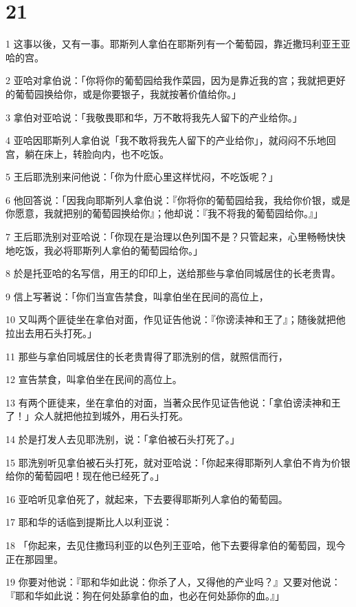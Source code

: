 \chapter{21}

\par 1 这事以後，又有一事。耶斯列人拿伯在耶斯列有一个葡萄园，靠近撒玛利亚王亚哈的宫。
\par 2 亚哈对拿伯说：「你将你的葡萄园给我作菜园，因为是靠近我的宫；我就把更好的葡萄园换给你，或是你要银子，我就按著价值给你。」
\par 3 拿伯对亚哈说：「我敬畏耶和华，万不敢将我先人留下的产业给你。」
\par 4 亚哈因耶斯列人拿伯说「我不敢将我先人留下的产业给你」，就闷闷不乐地回宫，躺在床上，转脸向内，也不吃饭。
\par 5 王后耶洗别来问他说：「你为什麽心里这样忧闷，不吃饭呢？」
\par 6 他回答说：「因我向耶斯列人拿伯说：『你将你的葡萄园给我，我给你价银，或是你愿意，我就把别的葡萄园换给你』；他却说：『我不将我的葡萄园给你。』」
\par 7 王后耶洗别对亚哈说：「你现在是治理以色列国不是？只管起来，心里畅畅快快地吃饭，我必将耶斯列人拿伯的葡萄园给你。」
\par 8 於是托亚哈的名写信，用王的印印上，送给那些与拿伯同城居住的长老贵胄。
\par 9 信上写著说：「你们当宣告禁食，叫拿伯坐在民间的高位上，
\par 10 又叫两个匪徒坐在拿伯对面，作见证告他说：『你谤渎神和王了』；随後就把他拉出去用石头打死。」
\par 11 那些与拿伯同城居住的长老贵胄得了耶洗别的信，就照信而行，
\par 12 宣告禁食，叫拿伯坐在民间的高位上。
\par 13 有两个匪徒来，坐在拿伯的对面，当著众民作见证告他说：「拿伯谤渎神和王了！」众人就把他拉到城外，用石头打死。
\par 14 於是打发人去见耶洗别，说：「拿伯被石头打死了。」
\par 15 耶洗别听见拿伯被石头打死，就对亚哈说：「你起来得耶斯列人拿伯不肯为价银给你的葡萄园吧！现在他已经死了。」
\par 16 亚哈听见拿伯死了，就起来，下去要得耶斯列人拿伯的葡萄园。
\par 17 耶和华的话临到提斯比人以利亚说：
\par 18 「你起来，去见住撒玛利亚的以色列王亚哈，他下去要得拿伯的葡萄园，现今正在那园里。
\par 19 你要对他说：『耶和华如此说：你杀了人，又得他的产业吗？』又要对他说：『耶和华如此说：狗在何处舔拿伯的血，也必在何处舔你的血。』」
